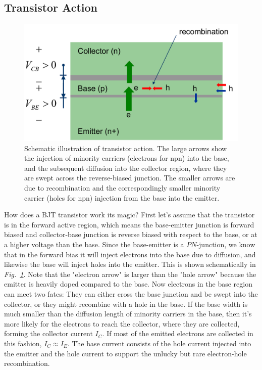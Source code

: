 \subsection{Transistor Action}
\begin{figure}[tb]
\centering
\includegraphics[width=.65\columnwidth]{slide9_bjt_action}
\caption{Schematic illustration of transistor action.  The large arrows show the injection of minority carriers (electrons for npn) into the base, and the subsequent diffusion into the collector region, where they are swept across the reverse-biased junction.  The smaller arrows are due to recombination and the correspondingly smaller minority carrier (holes for npn) injection from the base into the emitter.}
\label{fig:slide9_bjt_action}
\end{figure}
How does a BJT transistor work its magic?   First let's assume that the transistor is in the forward active region, which means the base-emitter junction is forward biased and collector-base junction is reverse biased with respect to the base, or at a higher voltage than the base.  
Since the base-emitter is a $PN$-junction, we know that in the forward bias it will inject electrons into the base due to diffusion, and likewise the base will inject holes into the emitter.  This is shown schematically in \emph{Fig.~\ref{fig:slide9_bjt_action}}.  Note that the "electron arrow" is larger than the "hole arrow" because the emitter is heavily doped compared to the base.  Now electrons in the base region can meet two fates:  They can either cross the base junction and be swept into the collector, or they might recombine with a hole in the base.  If the base width is much smaller than the diffusion length of minority carriers in the base, then it's more likely for the electrons to reach the collector, where they are collected, forming the collector current $I_C$.  If most of the emitted electrons are collected in this fashion, $I_C \approx I_E$.  
The base current consists of the hole current injected into the emitter and the hole current to support the unlucky but rare electron-hole recombination.  
